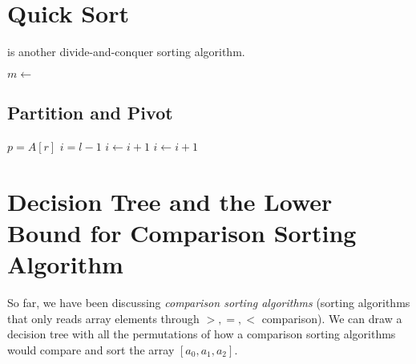 \documentclass{report}
\begin{document}
\section{Quick Sort}

 is another divide-and-conquer sorting algorithm.

\noindent \hrulefill
\begin{algorithmic}[0]
   
      \State $m \gets$ 
      \State {}
      \State {}
    \EndIf
    \State {}
  \EndFunction
\end{algorithmic}
\noindent \hrulefill

\subsection{Partition and Pivot}

\noindent \hrulefill
\begin{algorithmic}[0]
   
    \State $p = A[r]$
    \State $i = l - 1$
        \State $i \gets i + 1$
        \State {}
      \EndIf
    \EndFor
    \State $i \gets i + 1$
    \State {}
    \State {}
  \EndFunction
\end{algorithmic}
\noindent \hrulefill

\section[Comparison Sorting Algo Lower Bound]{Decision Tree and the Lower Bound for Comparison Sorting Algorithm }

So far, we have been discussing \textit{comparison sorting algorithms} (sorting algorithms that only reads array elements through $>, =, <$ comparison). We can draw a decision tree with all the permutations of how a comparison sorting algorithms would compare and sort the array $[a_{0}, a_{1}, a_{2}]$.

\begin{center}
\end{center}
\end{document}
